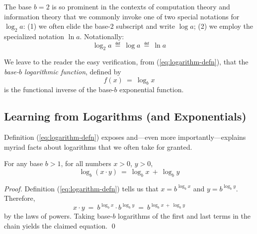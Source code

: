 The base $b = 2$ is so prominent in the contexts of computation theory
and information theory that we commonly invoke one of two special
notations for $\log_2 a$: (1) we often elide the base-$2$ subscript
and write $\log a$;
(2) we employ the specialized notation $\ln a$.  Notationally:
\[ \log_2 a \ \eqdef \ \log a \ \eqdef \ \ln a \]

We leave to the reader the easy verification, from
(\ref{eq:logarithm-defn}), that the {\it base-$b$ logarithmic
  function}, defined by
\begin{equation}
\label{eq:log-function-defn}
f(x) \ = \ \log_b x
\end{equation}
is the functional inverse of the base-$b$ exponential function.

\subsection{Learning from Logarithms (and Exponentials)}

Definition (\ref{eq:logarithm-defn}) exposes and---even more
importantly---explains myriad facts about logarithms that we often
take for granted.

\begin{prop}
\label{thm:log-add-multiply}
For any base $b >1$, for all numbers $x >0$, $y>0$,
\[ \log_b (x \cdot y) \ = \ \log_b x \ + \ \log_b y \]
\end{prop}

\begin{proof}
Definition (\ref{eq:logarithm-defn}) tells us that $x = b^{\log_b x}$
and $y = b^{\log_b y}$.  Therefore,
\[ x \cdot y \ = \ b^{\log_b x} \cdot b^{\log_b y} \ = \
b^{\log_b x \ + \ \log_b y} \]
by the laws of powers.  Taking base-$b$ logarithms of the first and
last terms in the chain yields the claimed equation.
\qed
\end{proof}

\medskip

